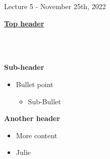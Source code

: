 \documentclass{article}
\newcommand{\NoteHeaderBig}[1]{
    \begin{Large}\underline{\textbf{#1}}\end{Large} \\ \\ 
}
\newcommand{\NoteHeaderSmall}[1]{
    \begin{large}\textbf{#1}\end{large} 
}
\newcommand{\NoteList}[1]{
    \begin{itemize}
        #1
    \end{itemize}
}
\begin{document}
Lecture 5 - November 25th, 2022\\

\NoteHeaderBig{Top header}
\NoteHeaderSmall{Sub-header}
\NoteList {
    \item  Bullet point
    \NoteList {
        \item  Sub-Bullet
    }
}
\NoteHeaderSmall{Another header}
\NoteList {
    \item  More content
}
\NoteList {
    \item  Julie
}
\end{document}
